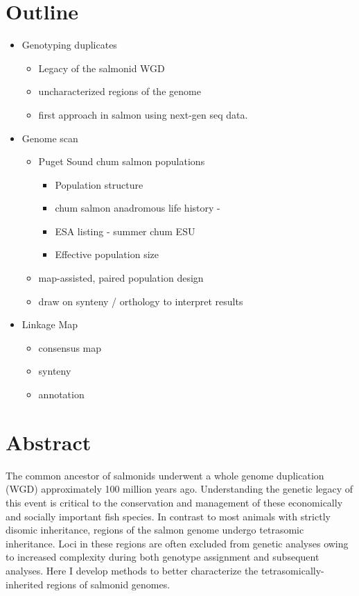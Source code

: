 \documentclass[12pt, one column]{article}
\begin{document}
% 

\section*{Outline}
\begin{itemize}

\item Genotyping duplicates
\begin{itemize}
\item Legacy of the salmonid WGD
\item uncharacterized regions of the genome 
\item first approach in salmon using next-gen seq data.
\end{itemize}

\item Genome scan
\begin{itemize}
\item Puget Sound chum salmon populations
\begin{itemize}
\item Population structure
\item chum salmon anadromous life history - 
\item ESA listing - summer chum ESU
\item Effective population size
\end{itemize}

\item map-assisted, paired population design
\item draw on synteny / orthology to interpret results
\end{itemize}

\item Linkage Map
\begin{itemize}
\item consensus map
\item synteny
\item annotation
\end{itemize}

\end{itemize}
\pagebreak


\section*{Abstract}
The common ancestor of salmonids underwent a whole genome duplication (WGD) approximately 100 million years ago. Understanding the genetic legacy of this event is critical to the conservation and management of these economically and socially important fish species. In contrast to most animals with strictly disomic inheritance, regions of the salmon genome undergo tetrasomic inheritance.  Loci in these regions are often excluded from genetic analyses owing to increased complexity during both genotype assignment and subsequent analyses. Here I develop methods to better characterize the tetrasomically-inherited regions of salmonid genomes.
\end{document}
